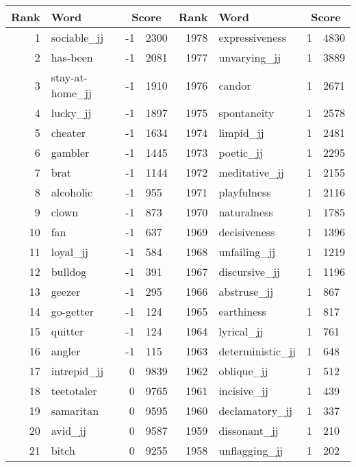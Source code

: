 \begin{table}[tbp]
    \begin{tabular}{| rlr@{.}l | rlr@{.}l |}
    \hline
    \textbf{Rank} & \textbf{Word} & \multicolumn{2}{c|}{\textbf{Score}} & \textbf{Rank} & \textbf{Word} & \multicolumn{2}{c|}{\textbf{Score}} \\
    \hline
    1 & sociable\_jj & -1 & 2300    &    1978 & expressiveness & 1 & 4830 \\
    2 & has-been & -1 & 2081    &    1977 & unvarying\_jj & 1 & 3889 \\
    3 & stay-at-home\_jj & -1 & 1910    &    1976 & candor & 1 & 2671 \\
    4 & lucky\_jj & -1 & 1897    &    1975 & spontaneity & 1 & 2578 \\
    5 & cheater & -1 & 1634    &    1974 & limpid\_jj & 1 & 2481 \\
    6 & gambler & -1 & 1445    &    1973 & poetic\_jj & 1 & 2295 \\
    7 & brat & -1 & 1144    &    1972 & meditative\_jj & 1 & 2155 \\
    8 & alcoholic & -1 & 955    &    1971 & playfulness & 1 & 2116 \\
    9 & clown & -1 & 873    &    1970 & naturalness & 1 & 1785 \\
    10 & fan & -1 & 637    &    1969 & decisiveness & 1 & 1396 \\
    11 & loyal\_jj & -1 & 584    &    1968 & unfailing\_jj & 1 & 1219 \\
    12 & bulldog & -1 & 391    &    1967 & discursive\_jj & 1 & 1196 \\
    13 & geezer & -1 & 295    &    1966 & abstruse\_jj & 1 & 867 \\
    14 & go-getter & -1 & 124    &    1965 & earthiness & 1 & 817 \\
    15 & quitter & -1 & 124    &    1964 & lyrical\_jj & 1 & 761 \\
    16 & angler & -1 & 115    &    1963 & deterministic\_jj & 1 & 648 \\
    17 & intrepid\_jj & 0 & 9839    &    1962 & oblique\_jj & 1 & 512 \\
    18 & teetotaler & 0 & 9765    &    1961 & incisive\_jj & 1 & 439 \\
    19 & samaritan & 0 & 9595    &    1960 & declamatory\_jj & 1 & 337 \\
    20 & avid\_jj & 0 & 9587    &    1959 & dissonant\_jj & 1 & 210 \\
    21 & bitch & 0 & 9255    &    1958 & unflagging\_jj & 1 & 202 \\

\end{tabular}
\end{table}
